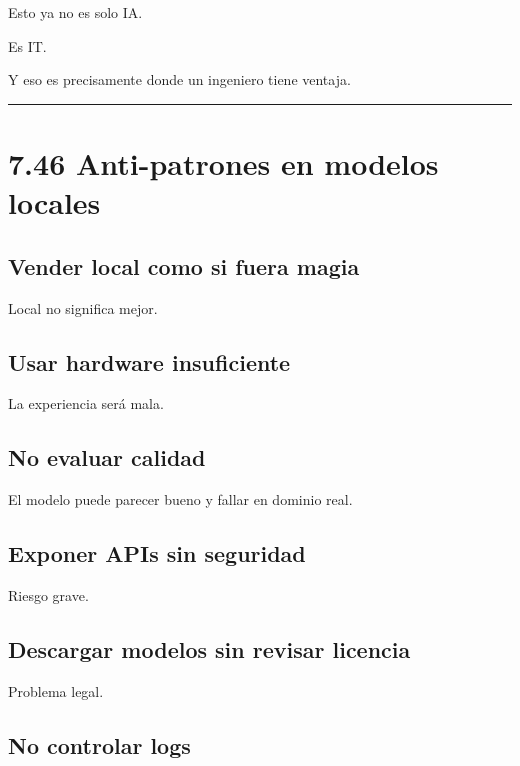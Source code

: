 Esto ya no es solo IA.

Es IT.

Y eso es precisamente donde un ingeniero tiene ventaja.

\begin{center}\rule{0.5\linewidth}{0.5pt}\end{center}

\section{7.46 Anti-patrones en modelos
locales}\label{anti-patrones-en-modelos-locales}

\subsection{Vender local como si fuera
magia}\label{vender-local-como-si-fuera-magia}

Local no significa mejor.

\subsection{Usar hardware
insuficiente}\label{usar-hardware-insuficiente}

La experiencia será mala.

\subsection{No evaluar calidad}\label{no-evaluar-calidad}

El modelo puede parecer bueno y fallar en dominio real.

\subsection{Exponer APIs sin
seguridad}\label{exponer-apis-sin-seguridad}

Riesgo grave.

\subsection{Descargar modelos sin revisar
licencia}\label{descargar-modelos-sin-revisar-licencia}

Problema legal.

\subsection{No controlar logs}\label{no-controlar-logs}

